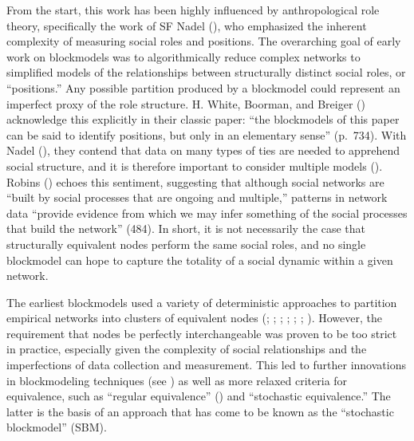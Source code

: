 \documentclass[
  12pt,
  a4paper,
  DIV=11,
  numbers=noendperiod,
  twoside,
  open=any]{scrartcl}
\begin{document}
From the start, this work has been highly influenced by anthropological
role theory, specifically the work of SF Nadel
(), who emphasized the
inherent complexity of measuring social roles and positions. The
overarching goal of early work on blockmodels was to algorithmically
reduce complex networks to simplified models of the relationships
between structurally distinct social roles, or ``positions.'' Any
possible partition produced by a blockmodel could represent an imperfect
proxy of the role structure. H. White, Boorman, and Breiger
() acknowledge this explicitly in
their classic paper: ``the blockmodels of this paper can be said to
identify positions, but only in an elementary sense'' (p.~734). With
Nadel (), they contend
that data on many types of ties are needed to apprehend social
structure, and it is therefore important to consider multiple models
().
Robins () echoes this
sentiment, suggesting that although social networks are ``built by
social processes that are ongoing and multiple,'' patterns in network
data ``provide evidence from which we may infer something of the social
processes that build the network'' (484). In short, it is not
necessarily the case that structurally equivalent nodes perform the same
social roles, and no single blockmodel can hope to capture the totality
of a social dynamic within a given network.

The earliest blockmodels used a variety of deterministic approaches to
partition empirical networks into clusters of equivalent nodes
(;
;
;
;
;
;
). However,
the requirement that nodes be perfectly interchangeable was proven to be
too strict in practice, especially given the complexity of social
relationships and the imperfections of data collection and measurement.
This led to further innovations in blockmodeling techniques (see
)
as well as more relaxed criteria for equivalence, such as ``regular
equivalence'' ()
and ``stochastic equivalence.'' The latter is the basis of an approach
that has come to be known as the ``stochastic blockmodel'' (SBM).
\end{document}
